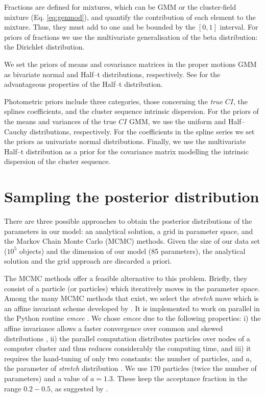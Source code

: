 Fractions are defined for mixtures, which can be GMM or the cluster-field mixture (Eq. \ref{eq:genmod}), and quantify the contribution of each element to the mixture. Thus, they must add to one and be bounded by the $[0,1]$ interval. For priors of fractions we use the multivariate generalisation of the beta distribution: the Dirichlet distribution. %

We set the priors of means and covariance matrices in the proper motions GMM as bivariate normal and Half--t distributions, respectively. See \citet{Huang2013} for the advantageous properties of the Half--t distribution.

Photometric priors include three categories, those concerning the \emph{true} $CI$, the splines coefficients, and the cluster sequence intrinsic dispersion. For the priors of the means and variances of the true $CI$ GMM, we use the uniform and Half--Cauchy distributions, respectively. For the coefficients in the spline series we set the priors as univariate normal distributions. Finally, we use the multivariate Half--t distribution as a prior for the covariance matrix modelling the intrinsic dispersion of the cluster sequence.


\section{Sampling the posterior distribution}
There are three possible approaches to obtain the posterior distributions of the parameters in our model: an analytical solution, a grid in parameter space, and the Markov Chain Monte Carlo (MCMC) methods. Given the size of our data set ($10^5$ objects) and the dimension of our model (85 parameters), the analytical solution and the grid approach are discarded a priori.%

The MCMC methods offer a feasible alternative to this problem. Briefly, they consist of a particle (or particles) which iteratively moves in the parameter space. Among the many MCMC methods that exist, we select the \emph{stretch} move which is an affine invariant scheme developed by \citet{Goodman2010}. It is implemented to work on parallel in the Python routine \emph{emcee} \citep{Foreman2013}. We chose \emph{emcee} due to the following properties: i) the affine invariance allows a faster convergence over common and skewed distributions \cite[see][for detail]{Goodman2010,Foreman2013}, ii) the parallel computation distributes particles over nodes of a computer cluster and thus reduces considerably the computing time, and iii) it requires the hand-tuning of only two constants: the number of particles, and $a$, the parameter of \emph{stretch} distribution \cite[see Eq. 9 of ][]{Goodman2010}. We use 170 particles (twice the number of parameters) and a value of $a=1.3$. These keep the acceptance fraction in the range $0.2 - 0.5$, as suggested by \citet{Foreman2013}.
 
